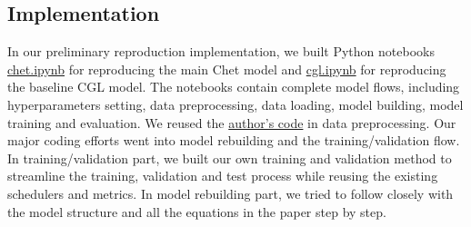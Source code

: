 \documentclass[11pt,a4paper,fleqn]{article}
\begin{document}
\subsection{Implementation}
In our preliminary reproduction implementation, we built Python notebooks
\href{https://github.com/willtsai/dlh-sp23-team53/blob/main/chet.ipynb}{chet.ipynb} 
for reproducing the main Chet model and 
\href{https://github.com/willtsai/dlh-sp23-team53/blob/main/cgl.ipynb}{cgl.ipynb}
for reproducing the baseline CGL model. The notebooks contain complete model
flows, including hyperparameters setting, data preprocessing, data loading,
model building, model training and evaluation. We reused the
\href{https://github.com/LuChang-CS/Chet}{author's code} in data preprocessing.
Our major coding efforts went into model rebuilding and the training/validation
flow. In training/validation part, we built our own training and validation
method to streamline the training, validation and test process while reusing the
existing schedulers and metrics. In model rebuilding part, we tried to follow
closely with the model structure and all the equations in the paper step by
step.
\end{document}
